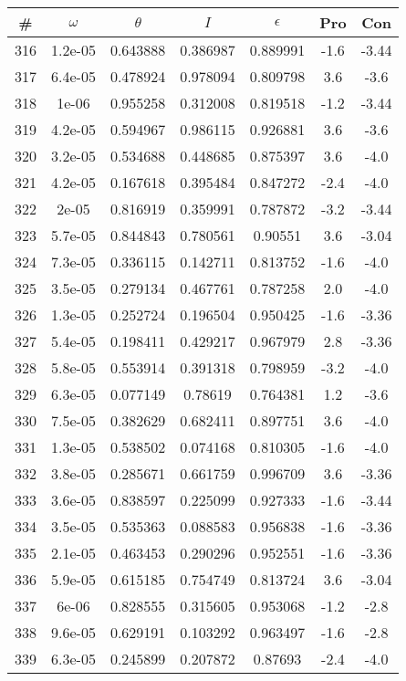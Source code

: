 \begin{table}
\begin{tabular}{c|c|c|c|c|c|c}
\# & $\omega$ & $\theta$ & $I$ & $\epsilon$ & Pro & Con\\
\hline
316 & 1.2e-05 & 0.643888 & 0.386987 & 0.889991 & -1.6 & -3.44\\
317 & 6.4e-05 & 0.478924 & 0.978094 & 0.809798 & 3.6 & -3.6\\
318 & 1e-06 & 0.955258 & 0.312008 & 0.819518 & -1.2 & -3.44\\
319 & 4.2e-05 & 0.594967 & 0.986115 & 0.926881 & 3.6 & -3.6\\
320 & 3.2e-05 & 0.534688 & 0.448685 & 0.875397 & 3.6 & -4.0\\
321 & 4.2e-05 & 0.167618 & 0.395484 & 0.847272 & -2.4 & -4.0\\
322 & 2e-05 & 0.816919 & 0.359991 & 0.787872 & -3.2 & -3.44\\
323 & 5.7e-05 & 0.844843 & 0.780561 & 0.90551 & 3.6 & -3.04\\
324 & 7.3e-05 & 0.336115 & 0.142711 & 0.813752 & -1.6 & -4.0\\
325 & 3.5e-05 & 0.279134 & 0.467761 & 0.787258 & 2.0 & -4.0\\
326 & 1.3e-05 & 0.252724 & 0.196504 & 0.950425 & -1.6 & -3.36\\
327 & 5.4e-05 & 0.198411 & 0.429217 & 0.967979 & 2.8 & -3.36\\
328 & 5.8e-05 & 0.553914 & 0.391318 & 0.798959 & -3.2 & -4.0\\
329 & 6.3e-05 & 0.077149 & 0.78619 & 0.764381 & 1.2 & -3.6\\
330 & 7.5e-05 & 0.382629 & 0.682411 & 0.897751 & 3.6 & -4.0\\
331 & 1.3e-05 & 0.538502 & 0.074168 & 0.810305 & -1.6 & -4.0\\
332 & 3.8e-05 & 0.285671 & 0.661759 & 0.996709 & 3.6 & -3.36\\
333 & 3.6e-05 & 0.838597 & 0.225099 & 0.927333 & -1.6 & -3.44\\
334 & 3.5e-05 & 0.535363 & 0.088583 & 0.956838 & -1.6 & -3.36\\
335 & 2.1e-05 & 0.463453 & 0.290296 & 0.952551 & -1.6 & -3.36\\
336 & 5.9e-05 & 0.615185 & 0.754749 & 0.813724 & 3.6 & -3.04\\
337 & 6e-06 & 0.828555 & 0.315605 & 0.953068 & -1.2 & -2.8\\
338 & 9.6e-05 & 0.629191 & 0.103292 & 0.963497 & -1.6 & -2.8\\
339 & 6.3e-05 & 0.245899 & 0.207872 & 0.87693 & -2.4 & -4.0\\

\end{tabular}
\end{table}
